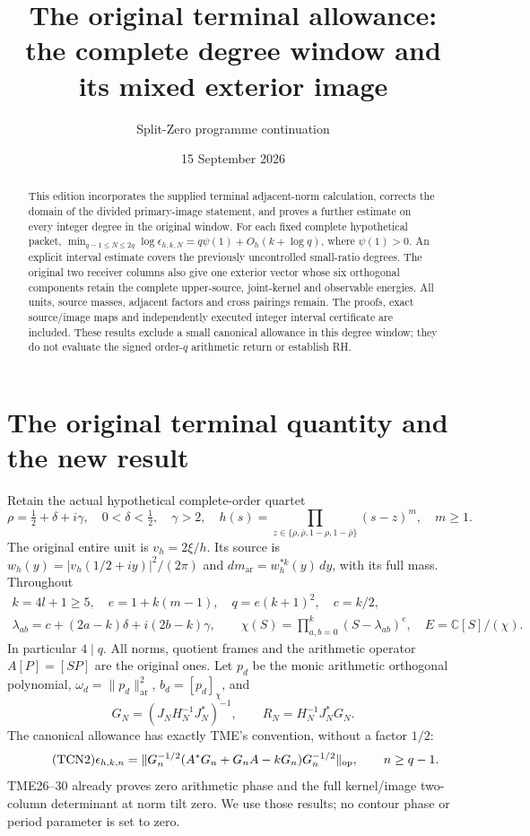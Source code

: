 \documentclass[11pt,a4paper]{article}
\title{The original terminal allowance:\\the complete degree window and its mixed exterior image}
\author{Split-Zero programme continuation}
\date{15 September 2026}
\begin{document}
\maketitle
\begin{abstract}
This edition incorporates the supplied terminal adjacent-norm calculation,
corrects the domain of the divided primary-image statement, and proves
a further estimate on every integer degree in the original window.
For each fixed complete hypothetical packet,
$\min_{q-1\le N\le2q}\log\epsilon_{h,k,N}=q\psi(1)+O_h(k+\log q)$,
where $\psi(1)>0$. An explicit interval estimate covers the previously
uncontrolled small-ratio degrees. The original two receiver columns
also give one exterior vector whose six orthogonal components retain
the complete upper-source, joint-kernel and observable energies.
All units, source masses, adjacent factors and cross pairings remain.
The proofs, exact source/image maps and independently executed
integer interval certificate are included. These results exclude a
small canonical allowance in this degree window; they do not evaluate
the signed order-$q$ arithmetic return or establish RH.
\end{abstract}
\tableofcontents
\clearpage
\begingroup
\providecommand{\C}{\mathbb C}
\providecommand{\R}{\mathbb R}
\providecommand{\ar}{\mathrm{ar}}
\providecommand{\Tr}{\operatorname{Tr}}
\section{The original terminal quantity and the new result}

Retain the actual hypothetical complete-order quartet
\[
 \rho=\tfrac12+\delta+i\gamma,\quad 0<\delta<\tfrac12,\quad\gamma>2,
 \quad h(s)=\prod_{z\in\{\rho,\bar\rho,1-\rho,1-\bar\rho\}}(s-z)^m,
 \quad m\ge1.
\]
The original entire unit is $v_h=2\xi/h$. Its source is
$w_h(y)=|v_h(1/2+iy)|^2/(2\pi)$ and $dm_{\ar}=w_h^{*k}(y)\,dy$,
with its full mass. Throughout
\begin{equation}\tag{TCN1}
 \begin{gathered}
 k=4l+1\ge5,\quad e=1+k(m-1),\quad q=e(k+1)^2,\quad c=k/2,\\
 \lambda_{ab}=c+(2a-k)\delta+i(2b-k)\gamma,\qquad
 \chi(S)=\prod_{a,b=0}^k(S-\lambda_{ab})^e,\quad E=\C[S]/(\chi).
 \end{gathered}
\end{equation}
In particular $4\mid q$. All norms, quotient frames and the arithmetic
operator $A[P]=[SP]$ are the original ones. Let $p_d$ be the monic
arithmetic orthogonal polynomial, $\omega_d=\|p_d\|_{\ar}^2$,
$b_d=[p_d]_\chi$, and
\[
 G_N=(J_NH_N^{-1}J_N^*)^{-1},\qquad R_N=H_N^{-1}J_N^*G_N.
\]
The canonical allowance has exactly TME's convention, without a factor
$1/2$:
\begin{equation}\tag{TCN2}
 \epsilon_{h,k,n}
 =\|G_n^{-1/2}(A^*G_n+G_nA-kG_n)G_n^{-1/2}\|_{\rm op},
 \qquad n\ge q-1.
\end{equation}
TME26--30 already proves zero arithmetic phase and the full
kernel/image two-column determinant at norm tilt zero. We use those
results; no contour phase or period parameter is set to zero.
\end{document}
